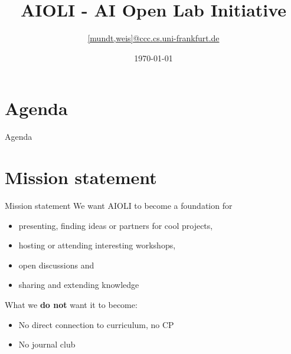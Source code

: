 \documentclass[aspectratio=169]{beamer}
\title{AIOLI - AI Open Lab Initiative}
\date{\today}
\author{\texorpdfstring{\url{[mundt,weis]@ccc.cs.uni-frankfurt.de}}{Tobias Weis}}
\institute{Systems Engineering for Computer Vision}
\begin{document}
{
\maketitle}


\section{Agenda}
	\begin{frame}{Agenda}
		\tableofcontents

	\end{frame}

\section{Mission statement}
	\begin{frame}{Mission statement}
		We want AIOLI to become a foundation for
		\begin{itemize}
			\item presenting, finding ideas or partners for cool projects,
			\item hosting or attending interesting workshops,
			\item open discussions and
			\item sharing and extending knowledge
		\end{itemize}
		\vfill
		What we \textbf{do not} want it to become:
		\begin{itemize}
			\item No direct connection to curriculum, no CP
			\item No journal club
		\end{itemize}
	\end{frame}
\end{document}
